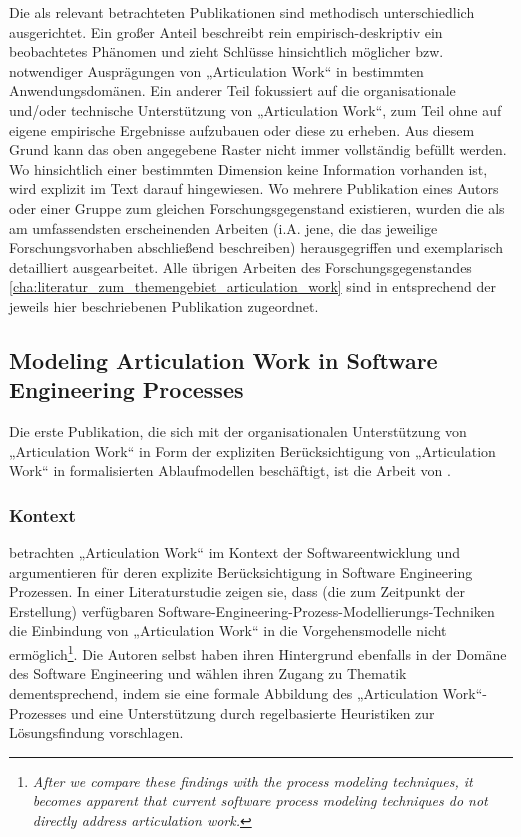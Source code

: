 Die als relevant betrachteten Publikationen sind methodisch unterschiedlich ausgerichtet. Ein großer Anteil beschreibt rein empirisch-deskriptiv ein beobachtetes Phänomen und zieht Schlüsse hinsichtlich möglicher bzw. notwendiger Ausprägungen von „Articulation Work“ in bestimmten Anwendungsdomänen. Ein anderer Teil fokussiert auf die organisationale und/oder technische Unterstützung von „Articulation Work“, zum Teil ohne auf eigene empirische Ergebnisse aufzubauen oder diese zu erheben. Aus diesem Grund kann das oben angegebene Raster nicht immer vollständig befüllt werden. Wo hinsichtlich einer bestimmten Dimension keine Information vorhanden ist, wird explizit im Text darauf hingewiesen. Wo mehrere Publikation eines Autors oder einer Gruppe zum gleichen Forschungsgegenstand existieren, wurden die als am umfassendsten erscheinenden Arbeiten (i.A. jene, die das jeweilige Forschungsvorhaben abschließend beschreiben) herausgegriffen und exemplarisch detailliert ausgearbeitet. Alle übrigen Arbeiten des Forschungsgegenstandes \ref{cha:literatur_zum_themengebiet_articulation_work} sind in entsprechend der jeweils hier beschriebenen Publikation zugeordnet.


\subsection{Modeling Articulation Work in Software Engineering Processes} %
\label{sub:modeling_articulation_work_in_software_engineering_processes}

Die erste Publikation, die sich mit der organisationalen Unterstützung von „Articulation Work“ in Form der expliziten Berücksichtigung von „Articulation Work“ in formalisierten Ablaufmodellen beschäftigt, ist die Arbeit von \citet{Mi91}.

\subsubsection{Kontext}

\citet{Mi91} betrachten „Articulation Work“ im Kontext der Softwareentwicklung und argumentieren für deren explizite Berücksichtigung in Software Engineering Prozessen. In einer Literaturstudie zeigen sie, dass (die zum Zeitpunkt der Erstellung) verfügbaren Software-Engineering-Prozess-Modellierungs-Techniken die Einbindung von „Articulation Work“ in die Vorgehensmodelle nicht ermöglich\footnote{\emph{After we compare these findings with the process modeling techniques, it becomes apparent that current software process modeling techniques do not directly address articulation work.}\citep[][S. 192]{Mi91}}. Die Autoren selbst haben ihren Hintergrund ebenfalls in der Domäne des Software Engineering und wählen ihren Zugang zu Thematik dementsprechend, indem sie eine formale Abbildung des „Articulation Work“-Prozesses und eine Unterstützung durch regelbasierte Heuristiken zur Lösungsfindung vorschlagen.

